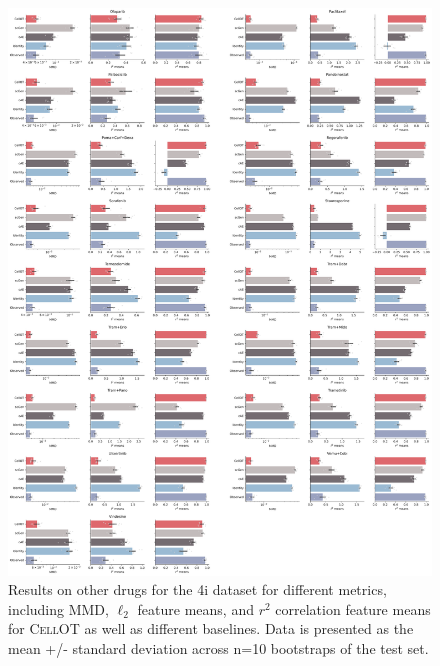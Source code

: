 \begin{figure}[H]
    \centering
    \includegraphics[width=\textwidth]{figures/cellot-methods/Bunne_Supp_Fig5_p2.pdf}
    \caption{Results on other drugs for the 4i dataset for different metrics, including MMD, $\ell_2$ feature means, and $r^2$ correlation feature means for \textsc{CellOT} as well as different baselines. Data is presented as the mean +/- standard deviation across n=10 bootstraps of the test set.}
    \label{supp_fig:4i_all_results}
\end{figure}

